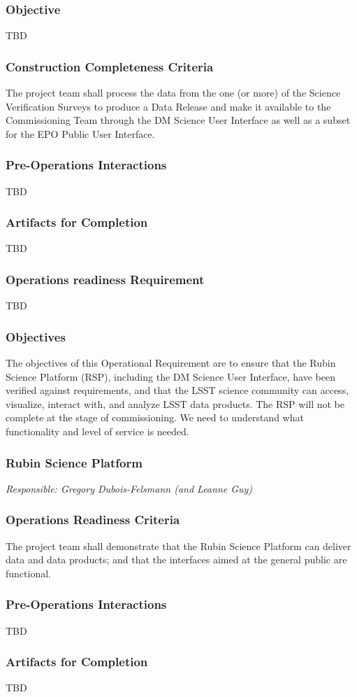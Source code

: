 \subsubsection{Objective} 
TBD

\subsubsection{Construction Completeness Criteria}
The project team shall process the data from the one (or more) of the Science Verification Surveys to produce a Data Release and make it available to the Commissioning Team through the DM Science User Interface as well as a subset for the EPO Public User Interface.

\subsubsection{Pre-Operations Interactions}
TBD

\subsubsection{Artifacts for Completion}
TBD

\subsubsection{Operations readiness Requirement}
TBD


\subsubsection{Objectives} 
The objectives of this Operational Requirement are to ensure that the Rubin Science Platform (RSP), including the DM Science User Interface, have been verified against requirements, and that the LSST science community can access, visualize, interact with, and analyze LSST data products. The RSP will not be complete at the stage of commissioning.  We need to understand what functionality and level of service is needed.

\subsubsection{Rubin Science Platform}
{\it Responsible: Gregory Dubois-Felsmann (and Leanne Guy)}

\subsubsection{Operations Readiness Criteria}
The project team shall demonstrate that the Rubin Science Platform can deliver data and data products; and that the interfaces aimed at the general public are functional.

\subsubsection{Pre-Operations Interactions}
TBD

\subsubsection{Artifacts for Completion}
TBD
 